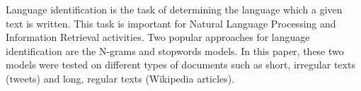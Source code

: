 Language identification is the task of determining the language which a given text is written. This task is important for Natural Language Processing and Information Retrieval activities. Two popular approaches for language identification are the N-grams and  stopwords models. In this paper, these two models were tested on different types of documents such as short, irregular texts (tweets) and long, regular texts (Wikipedia articles).
